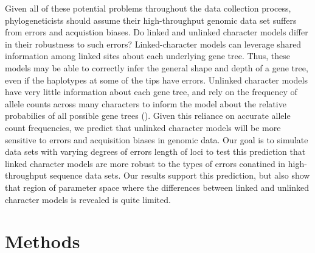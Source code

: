 Given all of these potential problems throughout the data collection process,
phylogeneticists should assume their high-throughput genomic data set suffers
from errors and acquistion biases.
Do linked and unlinked character models differ in their robustness to such
errors?
Linked-character models can leverage shared information among linked sites
about each underlying gene tree.
Thus, these models may be able to correctly infer the general shape and depth
of a gene tree, even if the haplotypes at some of the tips have errors.
Unlinked character models have very little information about each gene tree,
and rely on the frequency of allele counts across many characters to inform the
model about the relative probabilies of all possible gene trees
().
Given this reliance on accurate allele count frequencies, we predict that
unlinked character models will be more sensitive to errors and acquisition
biases in genomic data.
Our goal is to simulate data sets with varying degrees of errors length of loci
to test this prediction that linked character models are more robust to the
types of errors conatined in high-throughput sequence data sets.
Our results support this prediction, but also show that region of parameter
space where the differences between linked and unlinked character models is
revealed is quite limited.


\section{Methods}
